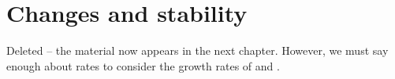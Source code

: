 \section{Changes and stability}
Deleted -- the material now appears in the next chapter. However, we must say enough about rates to consider the growth rates of \BM and \GBM.
%

